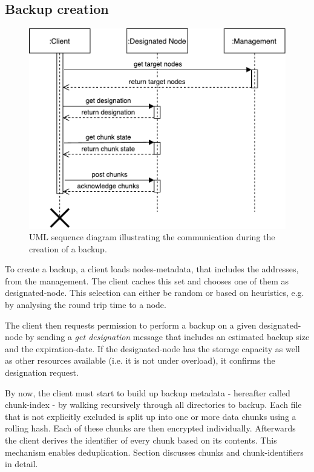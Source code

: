 \subsection{Backup creation}
\begin{figure}[h]
    \centering
    \includegraphics[width=\linewidth]{resources/create_backup_designated}
    \caption[Create Backup UML Sequence Diagram]{UML sequence diagram illustrating the communication during the creation of a backup.}
\end{figure}

To create a backup, a \gls{client} loads \glspl{node}-metadata, that includes the addresses, from the \gls{management}. The \gls{client} caches this set and chooses one of them as \gls{designated-node}. This selection can either be random or based on heuristics, e.g. by analysing the round trip time to a \gls{node}.

The \gls{client} then requests permission to perform a backup on a given \gls{designated-node} by sending a \emph{get designation} message that includes an estimated backup size and the \gls{expiration-date}. If the \gls{designated-node} has the storage capacity as well as other resources available (i.e. it is not under overload), it confirms the designation request.

By now, the \gls{client} must start to build up backup metadata - hereafter called \gls{chunk-index} - by walking recursively through all directories to backup. Each file that is not explicitly excluded is split up into one or more data \glspl{chunk} using a rolling hash\cite{borg-data-structures}. Each of these \glspl{chunk} are then encrypted individually. Afterwards the \gls{client} derives the identifier of every \gls{chunk} based on its contents. This mechanism enables deduplication. Section  discusses \glspl{chunk} and \glspl{chunk-identifier} in detail.


